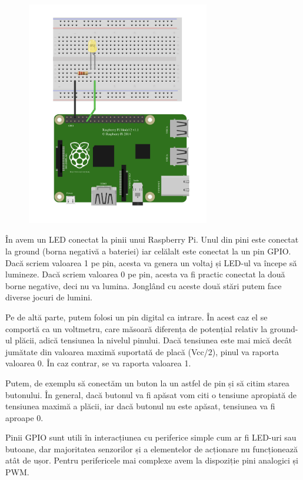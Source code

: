 \begin{figure}[!htbp]
	\centering
	\includegraphics[width=8cm]{chapters/15-embed/img/raspberry-img.png}
	\label{fig:embed-raspberry}
\end{figure}

În  avem un LED conectat la pinii
unui Raspberry Pi. Unul din pini este conectat la ground (borna negativă a
bateriei) iar celălalt este conectat la un pin GPIO. Dacă scriem valoarea 1 pe
pin, acesta va genera un voltaj și LED-ul va începe să lumineze. Dacă scriem
valoarea 0 pe pin, acesta va fi practic conectat la două borne negative, deci nu
va lumina. Jonglând cu aceste două stări putem face diverse jocuri de lumini.

Pe de altă parte, putem folosi un pin digital ca intrare. În acest caz el se
comportă ca un voltmetru, care măsoară diferența de potențial relativ la
ground-ul plăcii, adică tensiunea la nivelul pinului. Dacă tensiunea este mai
mică decât jumătate din valoarea maximă suportată de placă (Vcc/2), pinul va
raporta valoarea 0. În caz contrar, se va raporta valoarea 1.

Putem, de exemplu să conectăm un buton la un astfel de pin și să citim starea
butonului. În general, dacă butonul va fi apăsat vom citi o tensiune apropiată
de tensiunea maximă a plăcii, iar dacă butonul nu este apăsat, tensiunea va fi
aproape 0.

Pinii GPIO sunt utili în interacțiunea cu periferice simple cum ar fi LED-uri
sau butoane, dar majoritatea senzorilor și a elementelor de acționare nu
funcționează atât de ușor. Pentru perifericele mai complexe avem la dispoziție
pini analogici și PWM.

